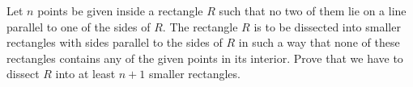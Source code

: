 Let 
$n$
 points be given inside a rectangle 
$R$
 such that no two of them lie on a line parallel to one of the sides of 
$R$.
 The rectangle 
$R$
 is to be dissected into smaller rectangles with sides parallel to the sides of 
$R$
 in such a way that none of these rectangles contains any of the given points in its interior. Prove that we have to dissect 
$R$
 into at least 
$n + 1$
 smaller rectangles.


